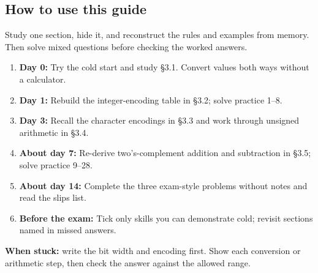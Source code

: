 \documentclass[11pt]{article}
\begin{document}
\begin{keepsection}
\section{How to use this guide}

Study one section, hide it, and reconstruct the rules and examples from memory. Then solve mixed questions before checking the worked answers.

\begin{enumerate}
\item \textbf{Day 0:} Try the cold start and study §3.1. Convert values both ways without a calculator.
\item \textbf{Day 1:} Rebuild the integer-encoding table in §3.2; solve practice 1–8.
\item \textbf{Day 3:} Recall the character encodings in §3.3 and work through unsigned arithmetic in §3.4.
\item \textbf{About day 7:} Re-derive two’s-complement addition and subtraction in §3.5; solve practice 9–28.
\item \textbf{About day 14:} Complete the three exam-style problems without notes and read the slips list.
\item \textbf{Before the exam:} Tick only skills you can demonstrate cold; revisit sections named in missed answers.
\end{enumerate}

\begin{notebox}\textbf{When stuck:} write the bit width and encoding first. Show each conversion or arithmetic step, then check the answer against the allowed range.\end{notebox}
\end{keepsection}
\end{document}
